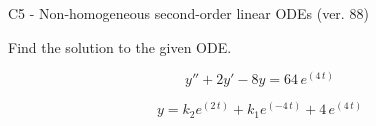 \begin{exercise}
  \begin{exerciseTitle}C5 - Non-homogeneous second-order linear ODEs (ver. 88)\end{exerciseTitle}
  \begin{exerciseStatement}
    
Find the solution to the given ODE.

    
\[y''+2y'-8y = 64 \, e^{\left(4 \, t\right)}\]

  \end{exerciseStatement}
  \begin{exerciseAnswer}
    
\[y= k_{2} e^{\left(2 \, t\right)} + k_{1} e^{\left(-4 \, t\right)} + 4 \, e^{\left(4 \, t\right)}\]

  \end{exerciseAnswer}
\end{exercise}